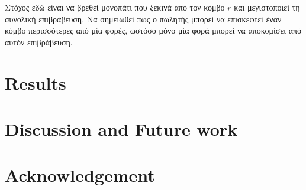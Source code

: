 \documentclass[oneside,12pt]{book}
\theoremstyle{definition}
\begin{document}
Στόχος εδώ είναι να βρεθεί μονοπάτι που ξεκινά από τον κόμβο \(r\) και μεγιστοποιεί τη συνολική επιβράβευση. Να σημειωθεί πως ο πωλητής μπορεί να επισκεφτεί έναν κόμβο περισσότερες από μία φορές, ωστόσο μόνο μία φορά μπορεί να αποκομίσει από αυτόν επιβράβευση. \\  

\chapter{Results}

\chapter{Discussion and Future work}

\chapter{Acknowledgement}
\end{document}
